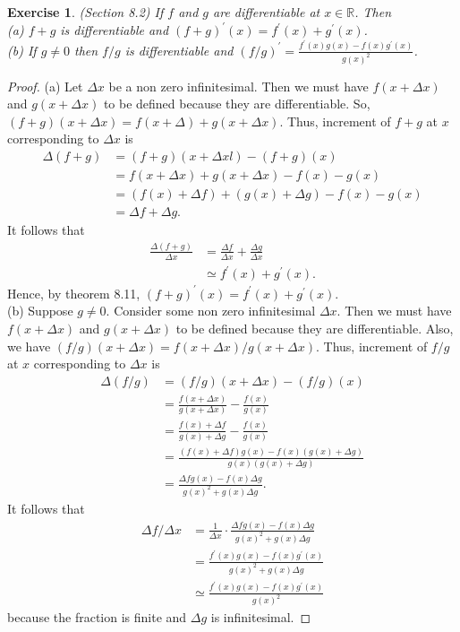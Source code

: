 \documentclass[a4paper, 11pt, openany]{book}
\theoremstyle{plain}
\newtheorem{exercise}{Exercise}[chapter]
\theoremstyle{plain}
\newcommand{\R}{\mathbb{R}}
\newcommand{\p}{\prime}
\newcommand{\Del}{\Delta}
\begin{document}
  \begin{exercise}
    (Section 8.2)
    If $f$ and $g$ are differentiable at $x \in \R$. Then \\
    (a) $f+g$ is differentiable and $(f+g)^\p (x)=f^\p(x)+g^\p (x)$. \\
    (b) If $g \not = 0$ then $f/g$ is differentiable and $(f/g)^\p = \frac{f^\p(x)g(x)-f(x)g^\p (x)}{g(x)^2}$.
  \end{exercise}
  \begin{proof}
    (a) Let $\Del x$ be a non zero infinitesimal. Then we must have $f(x+\Del x)$ and $g(x+\Del x)$ to be defined because they are differentiable. So, $(f+g)(x+\Del x)=f(x+\Del)+g(x+\Del x)$. Thus, increment of $f+g$ at $x$ corresponding to $\Delta x$ is 
      \begin{align*}
      \Delta (f+g) &= (f+g)(x+\Del xl) - (f+g)(x) \\
      &= f(x+\Del x) + g(x+\Del x) - f(x) -g(x) \\
      &=(f(x)+\Del f)+(g(x)+\Del g) - f(x) -g(x) \\
      &=\Del f + \Del g.
      \end{align*}
      It follows that 
      \begin{align*}
      \frac{\Del (f+g)}{\Del x} &= \frac{\Del f}{ \Del x} + \frac{\Del g}{\Del x} \\
      &\simeq f^\p (x) +g^\p (x).
      \end{align*}
      Hence, by theorem 8.11, $(f+g)^\p (x) = f^\p(x)+g^\p (x)$. \\
      
    (b) Suppose $g \not =0$. Consider some non zero infinitesimal $\Del x$. Then we must have $f(x +\Del x)$ and $g(x + \Del x)$ to be    defined because they are differentiable. Also, we have $(f/g)(x+\Delta x)=f(x+\Delta x)/g(x + \Delta x)$. Thus, increment of $f/g$ at $x$ corresponding to $\Delta x$ is 
      \begin{align*}
      \Delta (f/g) &= (f/g)(x+\Delta x) - (f/g)(x) \\
      &= \frac{f(x+\Delta x)}{g(x+ \Delta x)} -\frac{f(x)}{g(x)} \\
      &= \frac{f(x) + \Delta f}{g(x) +\Delta g} - \frac{f(x)}{g(x)} \\
      &= \frac{(f(x) + \Delta f)g(x) -f(x) (g(x) +\Delta g)}{g(x)(g(x)+\Delta g)} \\
      &= \frac{\Delta f g(x) - f(x) \Delta g}{g(x)^2 + g(x) \Delta g }.
      \end{align*}
      It follows that 
      \begin{align*}
      \Del f / \Del x &= \frac{1}{\Del x} \cdot \frac{\Delta f g(x) - f(x) \Delta g}{g(x)^2 + g(x) \Delta g } \\
      &= \frac{f^\p (x) g(x) - f(x) g^\p (x)}{g(x)^2+g(x) \Delta g} \\
      & \simeq \frac{f^\p (x) g(x) - f(x) g^\p (x)}{g(x)^2} 
      \end{align*}
      because the fraction is finite and $\Delta g$ is infinitesimal.
      \end{proof}
\end{document}
